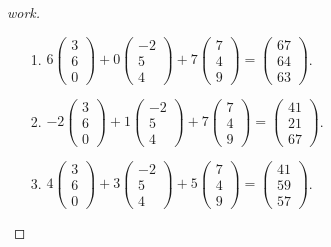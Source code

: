 \documentclass{article}
\begin{document}
\begin{question}{1.3}{}
{\begin{enumerate}
\begin{proof}[work]
\begin{enumerate}
          \item[1.] $6\begin{pmatrix}3 \\ 6 \\ 0\end{pmatrix} + 0\begin{pmatrix}-2 \\ 5 \\ 4\end{pmatrix} + 7\begin{pmatrix}7 \\ 4 \\ 9\end{pmatrix} = \begin{pmatrix}67 \\ 64 \\ 63\end{pmatrix}$.
          \item[2.] $-2\begin{pmatrix}3 \\ 6 \\ 0\end{pmatrix} + 1\begin{pmatrix}-2 \\ 5 \\ 4\end{pmatrix} + 7\begin{pmatrix}7 \\ 4 \\ 9\end{pmatrix} = \begin{pmatrix}41 \\ 21 \\ 67\end{pmatrix}$.
          \item[3.] $4\begin{pmatrix}3 \\ 6 \\ 0\end{pmatrix} + 3\begin{pmatrix}-2 \\ 5 \\ 4\end{pmatrix} + 5\begin{pmatrix}7 \\ 4 \\ 9\end{pmatrix} = \begin{pmatrix}41 \\ 59 \\ 57\end{pmatrix}$.

\end{enumerate}
\end{proof}
\end{enumerate}}
\end{question}
\end{document}
